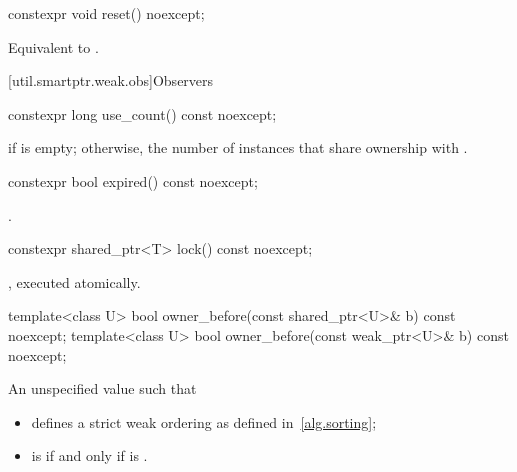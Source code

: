 %
\begin{itemdecl}
constexpr void reset() noexcept;
\end{itemdecl}

\begin{itemdescr}
\pnum
\effects
Equivalent to .
\end{itemdescr}

[util.smartptr.weak.obs]{Observers}
%
\begin{itemdecl}
constexpr long use_count() const noexcept;
\end{itemdecl}

\begin{itemdescr}
\pnum
\returns
{} if  is empty;
otherwise, the number of  instances
that share ownership with .
\end{itemdescr}

%
\begin{itemdecl}
constexpr bool expired() const noexcept;
\end{itemdecl}

\begin{itemdescr}
\pnum
\returns
{}.
\end{itemdescr}

%
\begin{itemdecl}
constexpr shared_ptr<T> lock() const noexcept;
\end{itemdecl}

\begin{itemdescr}
\pnum
\returns
{}, executed atomically.
\end{itemdescr}

%
\begin{itemdecl}
template<class U> bool owner_before(const shared_ptr<U>& b) const noexcept;
template<class U> bool owner_before(const weak_ptr<U>& b) const noexcept;
\end{itemdecl}

\begin{itemdescr}
\pnum
\returns
An unspecified value such that
\begin{itemize}
\item {} defines a strict weak ordering as defined in~\ref{alg.sorting};

\item {} is 
if and only if  is .
\end{itemize}
\end{itemdescr}

